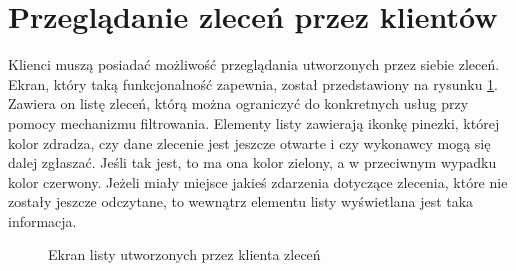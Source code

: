 \section{Przeglądanie zleceń przez klientów}

Klienci muszą posiadać możliwość przeglądania utworzonych przez siebie zleceń. Ekran, który taką funkcjonalność zapewnia, został przedstawiony na rysunku \ref{fig:client-jobs}. Zawiera on listę zleceń, którą można ograniczyć do konkretnych usług przy pomocy mechanizmu filtrowania.
Elementy listy zawierają ikonkę pinezki, której kolor zdradza, czy dane zlecenie jest jeszcze otwarte i czy wykonawcy mogą się dalej zgłaszać. Jeśli tak jest, to ma ona kolor zielony, a w przeciwnym wypadku kolor czerwony. Jeżeli miały miejsce jakieś zdarzenia dotyczące zlecenia, które nie zostały jeszcze odczytane, to wewnątrz elementu listy wyświetlana jest taka informacja. 

\begin{figure}[ht!]
  \centering
  \caption{Ekran listy utworzonych przez klienta zleceń}
  \label{fig:client-jobs}
\end{figure}
